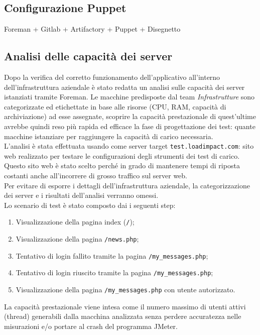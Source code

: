 \subsection{Configurazione Puppet}
Foreman + Gitlab + Artifactory + Puppet + Disegnetto
\subsection{Analisi delle capacità dei server}
Dopo la verifica del corretto funzionamento dell'applicativo all'interno dell'infrastruttura aziendale è stato redatta un analisi sulle capacità dei server istanziati tramite Foreman. Le macchine predisposte dal team \textit{Infrastrutture} sono categorizzate ed etichettate in base alle risorse (CPU, RAM, capacità di archiviazione) ad esse assegnate, scoprire la capacità prestazionale di quest'ultime avrebbe quindi reso più rapida ed efficace la fase di progettazione dei test: quante macchine istanziare per raggiungere la capacità di carico necessaria. \\ 
L'analisi è stata effettuata usando come server target \texttt{test.loadimpact.com}: sito web realizzato per testare le configurazioni degli strumenti dei test di carico. Questo sito web è stato scelto perché in grado di mantenere tempi di riposta costanti anche all'incorrere di grosso traffico sul server web.\\
Per evitare di esporre i dettagli dell'infrastruttura aziendale, la categorizzazione dei server e i risultati dell'analisi verranno omessi.\\
Lo scenario di test è stato composto dai i seguenti step:
\begin{enumerate}
	\item Visualizzazione della pagina index (\texttt{/});
	\item Visualizzazione della pagina \texttt{/news.php};
	\item Tentativo di login fallito tramite la pagina \texttt{/my\_messages.php};
	\item Tentativo di login riuscito tramite la pagina \texttt{/my\_messages.php};
	\item Visualizzazione della pagina \texttt{/my\_messages.php} con utente autorizzato.
\end{enumerate}
La capacità prestazionale viene intesa come il numero massimo di utenti attivi (thread) generabili dalla macchina analizzata senza perdere accuratezza nelle misurazioni e/o portare al \gls{crash} del programma JMeter.\\ 
